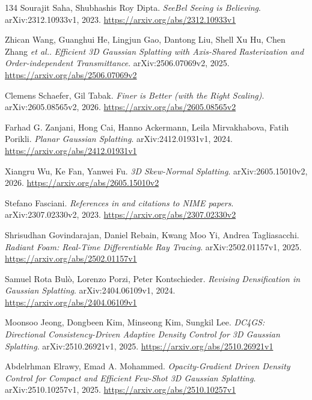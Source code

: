 \documentclass[11pt,a4paper]{article}
\begin{document}
\begin{thebibliography}{134}
Sourajit Saha, Shubhashis Roy Dipta.
\newblock \emph{SeeBel Seeing is Believing}.
\newblock arXiv:2312.10933v1, 2023.
\newblock \url{https://arxiv.org/abs/2312.10933v1}

Zhican Wang, Guanghui He, Lingjun Gao, Dantong Liu, Shell Xu Hu, Chen Zhang \emph{et al.}.
\newblock \emph{Efficient 3D Gaussian Splatting with Axis-Shared Rasterization and Order-independent Transmittance}.
\newblock arXiv:2506.07069v2, 2025.
\newblock \url{https://arxiv.org/abs/2506.07069v2}

Clemens Schaefer, Gil Tabak.
\newblock \emph{Finer is Better (with the Right Scaling)}.
\newblock arXiv:2605.08565v2, 2026.
\newblock \url{https://arxiv.org/abs/2605.08565v2}

Farhad G. Zanjani, Hong Cai, Hanno Ackermann, Leila Mirvakhabova, Fatih Porikli.
\newblock \emph{Planar Gaussian Splatting}.
\newblock arXiv:2412.01931v1, 2024.
\newblock \url{https://arxiv.org/abs/2412.01931v1}

Xiangru Wu, Ke Fan, Yanwei Fu.
\newblock \emph{3D Skew-Normal Splatting}.
\newblock arXiv:2605.15010v2, 2026.
\newblock \url{https://arxiv.org/abs/2605.15010v2}

Stefano Fasciani.
\newblock \emph{References in and citations to NIME papers}.
\newblock arXiv:2307.02330v2, 2023.
\newblock \url{https://arxiv.org/abs/2307.02330v2}

Shrisudhan Govindarajan, Daniel Rebain, Kwang Moo Yi, Andrea Tagliasacchi.
\newblock \emph{Radiant Foam: Real-Time Differentiable Ray Tracing}.
\newblock arXiv:2502.01157v1, 2025.
\newblock \url{https://arxiv.org/abs/2502.01157v1}

Samuel Rota Bul\`{o}, Lorenzo Porzi, Peter Kontschieder.
\newblock \emph{Revising Densification in Gaussian Splatting}.
\newblock arXiv:2404.06109v1, 2024.
\newblock \url{https://arxiv.org/abs/2404.06109v1}

Moonsoo Jeong, Dongbeen Kim, Minseong Kim, Sungkil Lee.
\newblock \emph{DC4GS: Directional Consistency-Driven Adaptive Density Control for 3D Gaussian Splatting}.
\newblock arXiv:2510.26921v1, 2025.
\newblock \url{https://arxiv.org/abs/2510.26921v1}

Abdelrhman Elrawy, Emad A. Mohammed.
\newblock \emph{Opacity-Gradient Driven Density Control for Compact and Efficient Few-Shot 3D Gaussian Splatting}.
\newblock arXiv:2510.10257v1, 2025.
\newblock \url{https://arxiv.org/abs/2510.10257v1}


\end{thebibliography}
\end{document}
